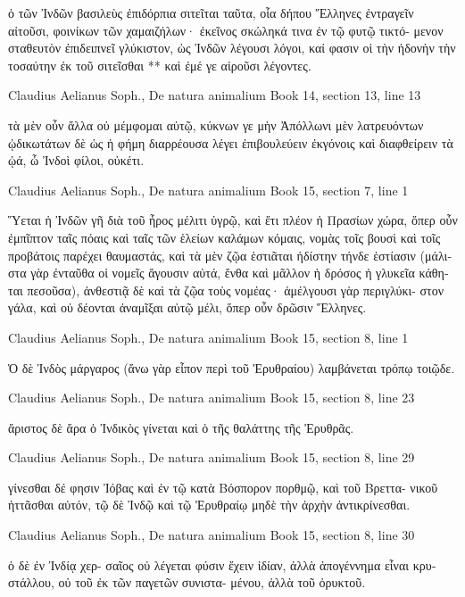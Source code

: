 \documentclass[12pt,letterpaper,twoside,final]{memoir}
\begin{document}
\begin{greek}
ὁ τῶν Ἰνδῶν βασιλεὺς ἐπιδόρπια σιτεῖται ταῦτα, οἷα 
δήπου Ἕλληνες ἐντραγεῖν αἰτοῦσι, φοινίκων τῶν 
χαμαιζήλων· ἐκεῖνος σκώληκά τινα ἐν τῷ φυτῷ τικτό-
μενον σταθευτὸν ἐπιδειπνεῖ γλύκιστον, ὡς Ἰνδῶν 
λέγουσι λόγοι, καί φασιν οἱ τὴν ἡδονὴν τὴν τοσαύτην 
ἐκ τοῦ σιτεῖσθαι ** καὶ ἐμέ γε αἱροῦσι λέγοντες. 



Claudius Aelianus Soph., De natura animalium 
Book 14, section 13, line 13

                                      τὰ μὲν οὖν ἄλλα   
οὐ μέμφομαι αὐτῷ, κύκνων γε μὴν Ἀπόλλωνι μὲν 
λατρευόντων ᾠδικωτάτων δὲ ὡς ἡ φήμη διαρρέουσα 
λέγει ἐπιβουλεύειν ἐκγόνοις καὶ διαφθείρειν τὰ ᾠά, 
ὦ Ἰνδοὶ φίλοι, οὐκέτι. 



Claudius Aelianus Soph., De natura animalium 
Book 15, section 7, line 1

Ὕεται ἡ Ἰνδῶν γῆ διὰ τοῦ ἦρος μέλιτι ὑγρῷ, καὶ 
ἔτι πλέον ἡ Πρασίων χώρα, ὅπερ οὖν ἐμπῖπτον ταῖς 
πόαις καὶ ταῖς τῶν ἑλείων καλάμων κόμαις, νομὰς 
τοῖς βουσὶ καὶ τοῖς προβάτοις παρέχει θαυμαστάς, καὶ 
τὰ μὲν ζῷα ἑστιᾶται ἡδίστην τήνδε ἑστίασιν (μάλιστα 
γὰρ ἐνταῦθα οἱ νομεῖς ἄγουσιν αὐτά, ἔνθα καὶ μᾶλλον 
ἡ δρόσος ἡ γλυκεῖα κάθηται πεσοῦσα), ἀνθεστιᾷ δὲ 
καὶ τὰ ζῷα τοὺς νομέας· ἀμέλγουσι γὰρ περιγλύκι-
στον γάλα, καὶ οὐ δέονται ἀναμῖξαι αὐτῷ μέλι, ὅπερ 
οὖν δρῶσιν Ἕλληνες. 



Claudius Aelianus Soph., De natura animalium 
Book 15, section 8, line 1

Ὁ δὲ Ἰνδὸς μάργαρος (ἄνω γὰρ εἶπον περὶ τοῦ   
Ἐρυθραίου) λαμβάνεται τρόπῳ τοιῷδε. 



Claudius Aelianus Soph., De natura animalium 
Book 15, section 8, line 23

                                                 ἄριστος 
δὲ ἄρα ὁ Ἰνδικὸς γίνεται καὶ ὁ τῆς θαλάττης τῆς 
Ἐρυθρᾶς. 



Claudius Aelianus Soph., De natura animalium 
Book 15, section 8, line 29

                             γίνεσθαι δέ φησιν Ἰόβας 
καὶ ἐν τῷ κατὰ Βόσπορον πορθμῷ, καὶ τοῦ Βρεττα-
νικοῦ ἡττᾶσθαι αὐτόν, τῷ δὲ Ἰνδῷ καὶ τῷ Ἐρυθραίῳ 
μηδὲ τὴν ἀρχὴν ἀντικρίνεσθαι. 



Claudius Aelianus Soph., De natura animalium 
Book 15, section 8, line 30

                                    ὁ δὲ ἐν Ἰνδίᾳ χερ-
σαῖος οὐ λέγεται φύσιν ἔχειν ἰδίαν, ἀλλὰ ἀπογέννημα 
εἶναι κρυστάλλου, οὐ τοῦ ἐκ τῶν παγετῶν συνιστα-
μένου, ἀλλὰ τοῦ ὀρυκτοῦ. 




\end{greek}
\end{document}
